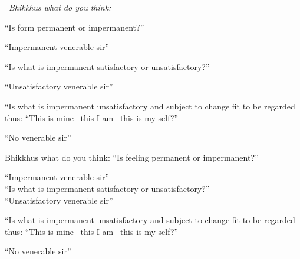 \begin{english-only-leader}
  \anglebracketleft\ \hspace{-0.5mm}\textit{Bhikkhus what do you think:} \hspace{-0.5mm}\anglebracketright\
\end{english-only-leader}
\begin{english-only-hangtogether}
  ``Is form permanent or impermanent?''
\end{english-only-hangtogether}
\begin{english-only-hangtogether}
  ``Impermanent venerable sir''
\end{english-only-hangtogether}
\begin{english-only-hangtogether}
  ``Is what is impermanent satisfactory or unsatisfactory?''
\end{english-only-hangtogether}
\begin{english-only-hangtogether}
  ``Unsatisfactory venerable sir''
\end{english-only-hangtogether}
\begin{english-only-hangtogether}
  ``Is what is impermanent unsatisfactory and subject to change fit to be regarded thus: ``This is mine \breathmark\ this I am \breathmark\ this is my self?''
\end{english-only-hangtogether}
\begin{english-only-hangtogether}
  ``No venerable sir''
\end{english-only-hangtogether}

\begin{english-only-nohang}
  \begin{english-only-hang}
    Bhikkhus what do you think: ``Is feeling permanent or impermanent?''
  \end{english-only-hang}
  ``Impermanent venerable sir''\\
  ``Is what is impermanent satisfactory or unsatisfactory?''\\
  ``Unsatisfactory venerable sir''\\
  \begin{english-hangtogether}
    ``Is what is impermanent unsatisfactory and subject to change fit to be regarded thus: ``This is mine \breathmark\ this I am \breathmark\ this is my self?''
  \end{english-hangtogether}
  ``No venerable sir''
\end{english-only-nohang}

